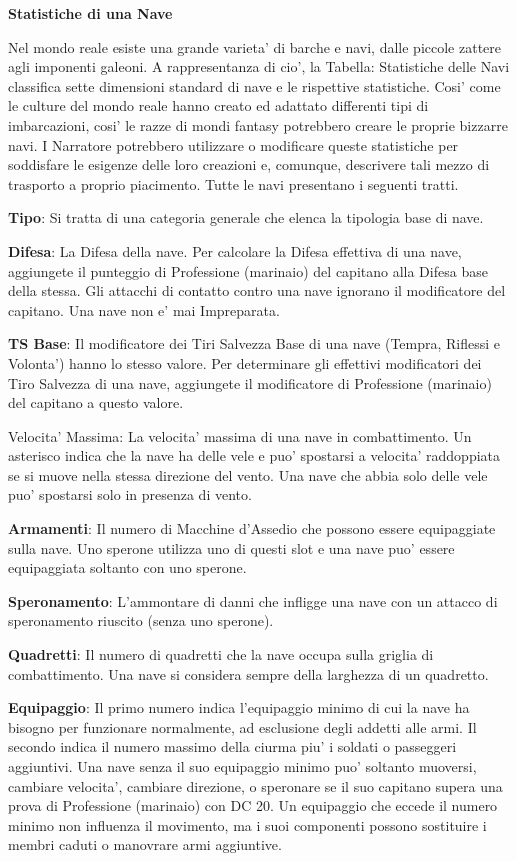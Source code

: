 \documentclass[a4paper,11pt,twoside,openany]{book}
\begin{document}
{		\textbf{Statistiche di una Nave}
		
		Nel mondo reale esiste una grande varieta' di barche e navi, dalle piccole zattere agli imponenti galeoni. A rappresentanza di cio', la Tabella: Statistiche delle Navi classifica sette dimensioni standard di nave e le rispettive statistiche. Cosi' come le culture del mondo reale hanno creato ed adattato differenti tipi di imbarcazioni, cosi' le razze di mondi fantasy potrebbero creare le proprie bizzarre navi.
		I Narratore potrebbero utilizzare o modificare queste statistiche per soddisfare le esigenze delle loro creazioni e, comunque, descrivere tali mezzo di trasporto a proprio piacimento. Tutte le navi presentano i seguenti tratti.
		
		\textbf{Tipo}: Si tratta di una categoria generale che elenca la tipologia base di nave.
		
		\textbf{Difesa}: La Difesa della nave. Per calcolare la Difesa effettiva di una nave, aggiungete il punteggio di Professione (marinaio) del capitano alla Difesa base della stessa. Gli attacchi di contatto contro una nave ignorano il modificatore del capitano. Una nave non e' mai Impreparata.
		
		\textbf{TS Base}: Il modificatore dei Tiri Salvezza Base di una nave (Tempra, Riflessi e Volonta') hanno lo stesso valore. Per determinare gli effettivi modificatori dei Tiro Salvezza di una nave, aggiungete il modificatore di Professione (marinaio) del capitano a questo valore.
		
		Velocita' Massima: La velocita' massima di una nave in combattimento. Un asterisco indica che la nave ha delle vele e puo' spostarsi a velocita' raddoppiata se si muove nella stessa direzione del vento. Una nave che abbia solo delle vele puo' spostarsi solo in presenza di vento.
		
		\textbf{Armamenti}: Il numero di Macchine d'Assedio che possono essere equipaggiate sulla nave. Uno sperone utilizza uno di questi slot e una nave puo' essere equipaggiata soltanto con uno sperone.
		
		\textbf{Speronamento}: L'ammontare di danni che infligge una nave con un attacco di speronamento riuscito (senza uno sperone).
		
		\textbf{Quadretti}: Il numero di quadretti che la nave occupa sulla griglia di combattimento. Una nave si considera sempre della larghezza di un quadretto.
		
		\textbf{Equipaggio}: Il primo numero indica l'equipaggio minimo di cui la nave ha bisogno per funzionare normalmente, ad esclusione degli addetti alle armi. Il secondo indica il numero massimo della ciurma piu' i soldati o passeggeri aggiuntivi. Una nave senza il suo equipaggio minimo puo' soltanto muoversi, cambiare velocita', cambiare direzione, o speronare se il suo capitano supera una prova di Professione (marinaio) con DC 20.
		Un equipaggio che eccede il numero minimo non influenza il movimento, ma i suoi componenti possono sostituire i membri caduti o manovrare armi aggiuntive.
		
}
\end{document}
